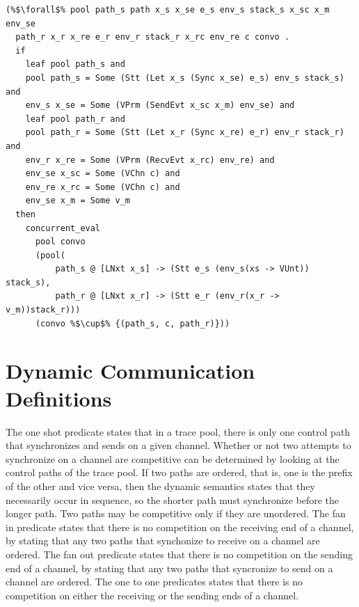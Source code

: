 \documentclass{article}
\begin{document}
\begin{lstlisting}[language=logic, escapechar=\%]
(%$\forall$% pool path_s path x_s x_se e_s env_s stack_s x_sc x_m env_se
  path_r x_r x_re e_r env_r stack_r x_rc env_re c convo .
  if 
    leaf pool path_s and
    pool path_s = Some (Stt (Let x_s (Sync x_se) e_s) env_s stack_s) and
    env_s x_se = Some (VPrm (SendEvt x_sc x_m) env_se) and
    leaf pool path_r and
    pool path_r = Some (Stt (Let x_r (Sync x_re) e_r) env_r stack_r) and
    env_r x_re = Some (VPrm (RecvEvt x_rc) env_re) and
    env_se x_sc = Some (VChn c) and
    env_re x_rc = Some (VChn c) and 
    env_se x_m = Some v_m
  then
    concurrent_eval
      pool convo
      (pool(
          path_s @ [LNxt x_s] -> (Stt e_s (env_s(xs -> VUnt)) stack_s), 
          path_r @ [LNxt x_r] -> (Stt e_r (env_r(x_r -> v_m))stack_r))) 
      (convo %$\cup$% {(path_s, c, path_r)}))

\end{lstlisting}

\section{Dynamic Communication Definitions}

The one shot predicate states that in a trace pool, there is only one control path that
synchronizes and sends on a given channel. Whether or not two attempts to synchronize on a
channel are competitive can be determined by
looking at the control paths of the trace pool. If two paths are ordered, that is, one is the
prefix of the other and vice versa, then the dynamic semantics states that they necessarily
occur in sequence, so the shorter path must synchronize before the longer path. Two paths may
be competitive only if they are unordered. The fan in predicate states that there is no
competition on the receiving end of a channel, by stating that any two paths that synchonize to
receive on a channel are ordered. The fan out predicate states that there is no competition on
the sending end of a channel, by stating that any two paths that syncronize to send on a
channel are ordered. The one to one predicates states that there is no competition on either
the receiving or the sending ends of a channel. 
\end{document}

